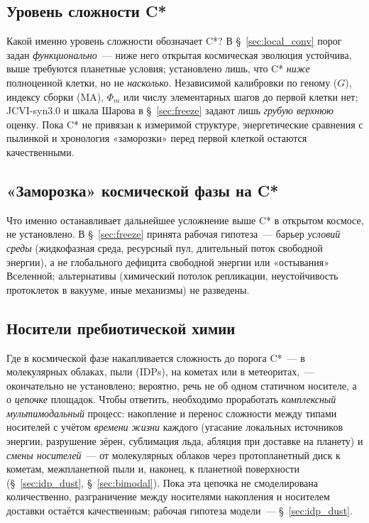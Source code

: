 \documentclass[12pt,a4paper]{article}
\begin{document}
\subsection{Уровень сложности C*}
\label{sec:open_cstar_level}

Какой именно уровень сложности обозначает C*? В \S~\ref{sec:local_conv} порог задан \emph{функционально}~--- ниже него открытая космическая эволюция устойчива, выше требуются планетные условия; установлено лишь, что C* \emph{ниже} полноценной клетки, но не \emph{насколько}. Независимой калибровки по геному ($G$), индексу сборки (MA), $\Phi_m$ или числу элементарных шагов до первой клетки нет; JCVI-syn3.0 и шкала Шарова в \S~\ref{sec:freeze} задают лишь \emph{грубую верхнюю} оценку. Пока C* не привязан к измеримой структуре, энергетические сравнения с пылинкой и хронология «заморозки» перед первой клеткой остаются качественными.

\subsection{«Заморозка» космической фазы на C*}
\label{sec:open_freeze}

Что именно останавливает дальнейшее усложнение выше C* в открытом космосе, не установлено. В \S~\ref{sec:freeze} принята рабочая гипотеза~--- барьер \emph{условий среды} (жидкофазная среда, ресурсный пул, длительный поток свободной энергии), а не глобального дефицита свободной энергии или «остывания» Вселенной; альтернативы (химический потолок репликации, неустойчивость протоклеток в вакууме, иные механизмы) не разведены.

\subsection{Носители пребиотической химии}
\label{sec:open_carriers}

Где в космической фазе накапливается сложность до порога C*~--- в молекулярных облаках, пыли (IDPs), на кометах или в метеоритах,~--- окончательно не установлено; вероятно, речь не об одном статичном носителе, а о \emph{цепочке} площадок. Чтобы ответить, необходимо проработать \emph{комплексный мультимодальный} процесс: накопление и перенос сложности между типами носителей с учётом \emph{времени жизни} каждого (угасание локальных источников энергии, разрушение зёрен, сублимация льда, абляция при доставке на планету) и \emph{смены носителей}~--- от молекулярных облаков через протопланетный диск к кометам, межпланетной пыли и, наконец, к планетной поверхности (\S~\ref{sec:idp_dust}, \S~\ref{sec:bimodal}). Пока эта цепочка не смоделирована количественно, разграничение между носителями накопления и носителем доставки остаётся качественным; рабочая гипотеза модели~--- \S~\ref{sec:idp_dust}.
\end{document}
